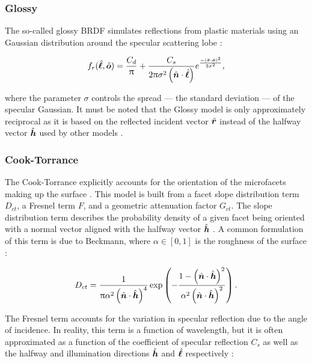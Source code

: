\subsubsection{Glossy}

The so-called glossy BRDF simulates reflections from plastic materials using an Gaussian distribution around the specular scattering lobe \cite{duvenhage2013}:

\begin{equation} \label{eq:brdf_glossy}
  f_r(\hat{\bm{\ell}}, \hat{\bm{o}}) = \frac{C_d}{\uppi} + \frac{C_s}{2\uppi \sigma^2 \left(\hat{\bm{n}} \cdot \hat{\bm{\ell}}\right)}  e^{\frac{-\left( \hat{\bm{r}} \cdot \hat{\bm{o}} \right)^2}{2\sigma^2}},
\end{equation}

where the parameter $\sigma$ controls the spread --- the standard deviation --- of the specular Gaussian. It must be noted that the Glossy model is only approximately reciprocal as it is based on the reflected incident vector $\hat{\bm{r}}$ instead of the halfway vector $\hat{\bm{h}}$ used by other models \cite{duvenhage2013}.

\subsubsection{Cook-Torrance}

The Cook-Torrance explicitly accounts for the orientation of the microfacets making up the surface \cite{cook1982}. This model is built from a facet slope distribution term $D_{ct}$, a Fresnel term $F$, and a geometric attenuation factor $G_{ct}$. The slope distribution term describes the probability density of a given facet being oriented with a normal vector aligned with the halfway vector $\hat{\bm{h}}$ \cite{cook1982}. A common formulation of this term is due to Beckmann, where $\alpha \in [0, 1]$ is the roughness of the surface \cite{cook1982}:

\begin{equation} \label{eq:d_beckmann}
  D_{ct} = \frac{1}{\uppi \alpha^2 \left( \hat{\bm{n}} \cdot \hat{\bm{h}} \right)^4} \exp\left( - \frac{1 - \left(\hat{\bm{n}} \cdot \hat{\bm{h}}\right)^2}{\alpha^2 \left( \hat{\bm{n}} \cdot \hat{\bm{h}} \right)^2} \right).
\end{equation}

The Fresnel term accounts for the variation in specular reflection due to the angle of incidence. In reality, this term is a function of wavelength, but it is often approximated as a function of the coefficient of specular reflection $C_s$ as well as the halfway and illumination directions $\hat{\bm{h}}$ and $\hat{\bm{\ell}}$ respectively \cite{cook1982}:

